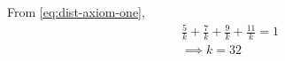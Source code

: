 	From \eqref{eq:dist-axiom-one},
\begin{align} 
\frac{5}{k} + \frac{7}{k} + \frac{9}{k} + \frac{11}{k} = 1\\
\implies 
k = 32 
\end{align}


